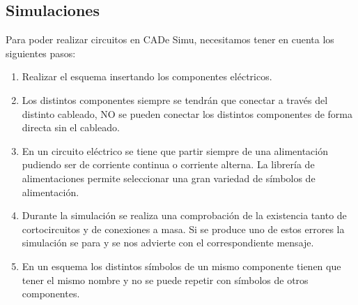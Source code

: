 \documentclass[
	12pt, %
	fleqn, %
	a4paper, %
	oneside, %
]{LegrandOrangeBook}
\begin{document}
\subsection{Simulaciones}
Para poder realizar circuitos en CADe Simu, necesitamos tener en cuenta los siguientes pasos:
\begin{enumerate}
\item Realizar el esquema insertando los componentes eléctricos.
\item Los distintos componentes siempre se tendrán que conectar a través del distinto cableado, NO se pueden conectar los distintos componentes de forma directa sin el cableado.
\item En un circuito eléctrico se tiene que partir siempre de una alimentación pudiendo ser de corriente continua o corriente alterna. La librería de alimentaciones permite seleccionar una gran variedad de símbolos de alimentación.
\item Durante la simulación se realiza una comprobación de la existencia tanto de cortocircuitos y de conexiones a masa. Si se produce uno de estos errores la simulación se para y se nos advierte con el correspondiente mensaje.
\item En un esquema los distintos símbolos de un mismo componente tienen que tener el mismo nombre y no se puede repetir con símbolos de otros componentes.
\end{enumerate}
\end{document}

